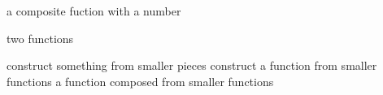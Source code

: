 \documentclass[fleqn,letterpaper,12pt,printwatermark=false]{memoir}
\begin{document}
\newcommand{\myClassName}{Pre-AP Algebra 2}
\newcommand{\myUnitNumber}{1}
\newcommand{\myUnitTitle}{Introduction to Functions}
\newcommand{\myLessonNumber}{8}
\newcommand{\myLessonTitle}{Composing Functions}



\pagestyle{myPagestyle}

\checkandfixthelayout
{}

\begin{myNotesHeader}
    \item {} a composite fuction with a number
    \item {} two functions
\end{myNotesHeader}

\begin{myVocabulary}
        {
            construct something from smaller pieces
        }
        {
            construct a function from smaller functions
        }
        {
            a function composed from smaller functions
        }
\end{myVocabulary}
\end{document}
